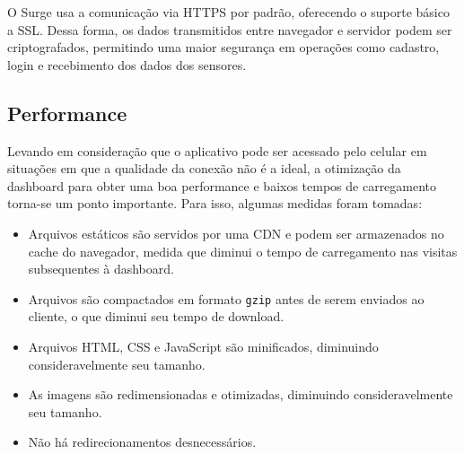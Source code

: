 O Surge usa a comunicação via HTTPS por padrão, oferecendo o suporte básico a SSL. Dessa forma, os dados transmitidos entre navegador e servidor podem ser criptografados, permitindo uma maior segurança em operações como cadastro, login e recebimento dos dados dos sensores.

\subsection{Performance}

Levando em consideração que o aplicativo pode ser acessado pelo celular em situações em que a qualidade da conexão não é a ideal, a otimização da dashboard para obter uma boa performance e baixos tempos de carregamento torna-se um ponto importante. Para isso, algumas medidas foram tomadas:

\begin{itemize}
\item Arquivos estáticos são servidos por uma CDN e podem ser armazenados no cache do navegador, medida que diminui o tempo de carregamento nas visitas subsequentes à dashboard.
\item Arquivos são compactados em formato \texttt{gzip} antes de serem enviados ao cliente, o que diminui seu tempo de download.
\item Arquivos HTML, CSS e JavaScript são minificados, diminuindo consideravelmente seu tamanho.
\item As imagens são redimensionadas e otimizadas, diminuindo consideravelmente seu tamanho.
\item Não há redirecionamentos desnecessários.
\end{itemize}
